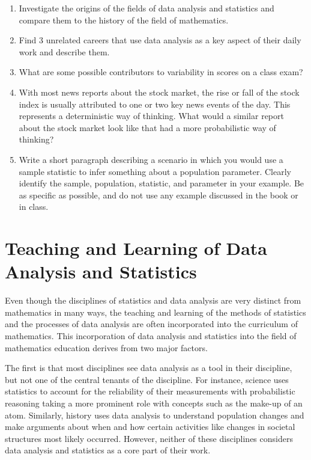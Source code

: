 \documentclass[
]{book}
\let\stdsection\section
\renewcommand\section{\newpage\stdsection}
\theoremstyle{definition}
\theoremstyle{definition}
\theoremstyle{definition}
\theoremstyle{definition}
\theoremstyle{remark}
\begin{document}
\begin{enumerate}
\def\labelenumi{\arabic{enumi}.}
\item
  Investigate the origins of the fields of data analysis and statistics and compare them to the history of the field of mathematics.
\item
  Find 3 unrelated careers that use data analysis as a key aspect of their daily work and describe them.
\item
  What are some possible contributors to variability in scores on a class exam?
\item
  With most news reports about the stock market, the rise or fall of the stock index is usually attributed to one or two key news events of the day. This represents a deterministic way of thinking. What would a similar report about the stock market look like that had a more probabilistic way of thinking?
\item
  Write a short paragraph describing a scenario in which you would use a sample statistic to infer something about a population parameter. Clearly identify the sample, population, statistic, and parameter in your example. Be as specific as possible, and do not use any example discussed in the book or in class.
\end{enumerate}

\hypertarget{teaching-and-learning-of-data-analysis-and-statistics}{%
\section{Teaching and Learning of Data Analysis and Statistics}\label{teaching-and-learning-of-data-analysis-and-statistics}}

Even though the disciplines of statistics and data analysis are very distinct from mathematics in many ways, the teaching and learning of the methods of statistics and the processes of data analysis are often incorporated into the curriculum of mathematics. This incorporation of data analysis and statistics into the field of mathematics education derives from two major factors.

The first is that most disciplines see data analysis as a tool in their discipline, but not one of the central tenants of the discipline. For instance, science uses statistics to account for the reliability of their measurements with probabilistic reasoning taking a more prominent role with concepts such as the make-up of an atom. Similarly, history uses data analysis to understand population changes and make arguments about when and how certain activities like changes in societal structures most likely occurred. However, neither of these disciplines considers data analysis and statistics as a core part of their work.
\end{document}
